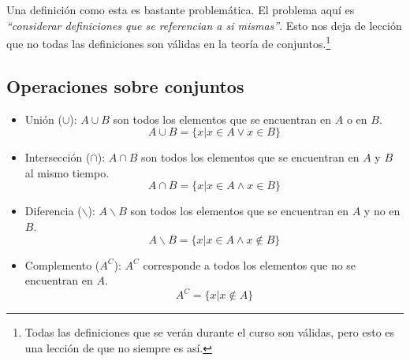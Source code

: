 \documentclass[../main.tex]{subfiles}
\begin{document}
Una definición como esta es bastante problemática. El problema aquí es \textit{``considerar definiciones que se referencian a si mismas''}. Esto nos deja de lección que no todas las definiciones son válidas en la teoría de conjuntos.\footnote{Todas las definiciones que se verán durante el curso son válidas, pero esto es una lección de que no siempre es así.}

\subsection{Operaciones sobre conjuntos}
\begin{itemize}
    \item Unión ($\cup$): $A \cup B$ son todos los elementos que se encuentran en $A$ o en $B$.
    \[ A \cup B = \{ x | x \in A \vee x \in B \} \]
    \item Intersección ($\cap$): $A \cap B$ son todos los elementos que se encuentran en $A$ y $B$ al mismo tiempo.
    \[ A \cap B = \{ x | x \in A \wedge x \in B \} \]
    \item Diferencia ($\backslash$): $A \backslash B$ son todos los elementos que se encuentran en $A$ y no en $B$.
    \[ A \backslash B = \{ x | x \in A \wedge x \not\in B \} \]
    \item Complemento ($A^C$): $A^C$ corresponde a todos los elementos que no se encuentran en $A$.
    \[ A^C = \{ x | x \not\in A\} \]
\end{itemize}
\end{document}
